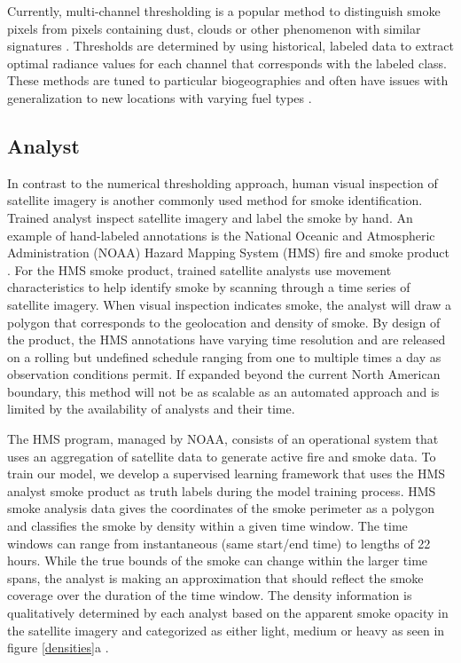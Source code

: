 \documentclass{article}
\begin{document}
Currently, multi-channel thresholding is a popular method to distinguish smoke pixels from pixels containing dust, clouds or other phenomenon with similar signatures \cite{threshold}. Thresholds are determined by using historical, labeled data to extract optimal radiance values for each channel that corresponds with the labeled class. These methods are tuned to particular biogeographies and often have issues with generalization to new locations with varying fuel types \cite{thresh_geog}.

\subsection{Analyst} 
In contrast to the numerical thresholding approach, human visual inspection of satellite imagery is another commonly used method for smoke identification. Trained analyst inspect satellite imagery and label the smoke by hand. An example of hand-labeled annotations is the National Oceanic and Atmospheric Administration (NOAA) Hazard Mapping System (HMS) fire and smoke product \cite{hms, hms_val}. For the HMS smoke product, trained satellite analysts use movement characteristics to help identify smoke by scanning through a time series of satellite imagery. When visual inspection indicates smoke, the analyst will draw a polygon that corresponds to the geolocation and density of smoke. By design of the product, the HMS annotations have varying time resolution and are released on a rolling but undefined schedule ranging from one to multiple times a day as observation conditions permit. If expanded beyond the current North American boundary, this method will not be as scalable as an automated approach and is limited by the availability of analysts and their time. 

The HMS program, managed by NOAA, consists of an operational system that uses an aggregation of satellite data to generate active fire and smoke data. To train our model, we develop a supervised learning framework that uses the HMS analyst smoke product as truth labels during the model training process. HMS smoke analysis data gives the coordinates of the smoke perimeter as a polygon and classifies the smoke by density within a given time window. The time windows can range from instantaneous (same start/end time) to lengths of 22 hours. While the true bounds of the smoke can change within the larger time spans, the analyst is making an approximation that should reflect the smoke coverage over the duration of the time window. The density information is qualitatively determined by each analyst based on the apparent smoke opacity in the satellite imagery and categorized as either light, medium or heavy as seen in figure \ref{densities}a \cite{hms_web}.
\end{document}
